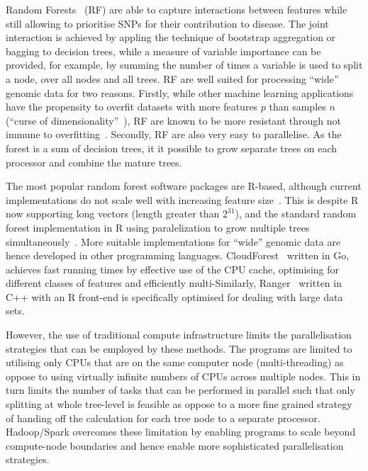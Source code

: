 \documentclass[10pt,a4paper]{article}  %
\begin{document}
Random Forests~\cite{Breiman2001} (RF) are able to capture interactions between features while still allowing to prioritise SNPs for their contribution to disease. 
The joint interaction is achieved by appling the technique of bootstrap aggregation or bagging to decision trees, while a measure of variable importance can be provided, for example, by summing the number of times a variable is used to split a node, over all nodes and all trees.
RF are well suited for processing ``wide'' genomic data for two reasons. 
Firstly, while other machine learning applications have the propensity to overfit datasets with more features $p$ than samples $n$ (``curse of dimensionality''~\cite{Bauer2014, bellman1961adaptive}), RF are known to be more resistant through not immune to overfitting~\cite{Segal.2004}.
Secondly, RF are also very easy to parallelise. As the forest is a sum of decision trees, it it possible to grow separate trees on each processor and combine the mature trees. 

The most popular random forest software packages are R-based, although current implementations do not scale well with increasing feature size~\cite{Wright.and.Ziegle.2016}. 
This is despite R now supporting long vectors (length greater than $2^{31}$), and the standard {\sc random forest} implementation in R using paralelization to grow multiple trees simultaneously~\cite{Liaw2002}. 
More suitable implementations for ``wide'' genomic data are hence developed in other programming languages.  
{\sc CloudForest}~\cite{Bressler2015} written in Go, achieves fast running times by effective use of the CPU cache, optimising for different classes of features and efficiently multi-Similarly, {\sc Ranger}~\cite{Wright.and.Ziegle.2016} written in C++ with an R front-end is specifically optimised for dealing with large data sets.

However, the use of traditional compute infrastructure limits the parallelisation strategies that can be employed by these methods. 
The programs are limited to utilising only CPUs that are on the same computer node (multi-threading) as oppose to using virtually infinite numbers of CPUs across multiple nodes. This in turn limits the number of tasks that can be performed in parallel such that only splitting at whole tree-level is feasible as oppose to a more fine grained strategy of handing off the calculation for each tree node to a separate processor. 
Hadoop/Spark overcomes these limitation by enabling programs to scale beyond compute-node boundaries and hence enable more sophisticated parallelisation strategies.  
\end{document}
